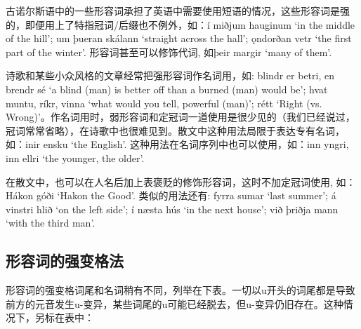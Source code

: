 古诺尔斯语中的一些形容词承担了英语中需要使用短语的情况，这些形容词是强的，即便用上了特指冠词/后缀也不例外，如：í
miðjum hauginum `in the middle of the hill‌'; um þueran skálann `straight
across the hall‌'; ǫndorðan vetr `the first part of the winter‌'.
形容词甚至可以修饰代词, 如þeir margir `many of them‌'.

诗歌和某些小众风格的文章经常把强形容词作名词用，如: blindr er betri, en
brendr sé `a blind (man) is better off than a burned (man) would be‌';
hvat muntu, ríkr, vinna `what would you tell, powerful (man)‌'; rétt
`Right (vs.
Wrong)‌'。作名词用时，弱形容词和定冠词一道使用是很少见的（我们已经说过，冠词常常省略），在诗歌中也很难见到。散文中这种用法局限于表达专有名词，如：inir
ensku `the English‌'. 这种用法在名词序列中也可以使用，如：inn yngri, inn
ellri `the younger, the older‌'.

在散文中，也可以在人名后加上表褒贬的修饰形容词，这时不加定冠词使用,
如：Hákon góði `Hakon the Good‌'. 类似的用法还有: fyrra sumar `last
summer‌'; á vinstri hlið `on the left side‌'; í næsta hús `in the next
house‌'; við þriðja mann `with the third man‌'.

\subsection{形容词的强变格法}\label{形容词的强变格法}

形容词的强变格词尾和名词稍有不同，列举在下表。一切以u开头的词尾都是导致前方的元音发生u-变异，某些词尾的u可能已经脱去，但u-变异仍旧存在。这种情况下，另标在表中：

